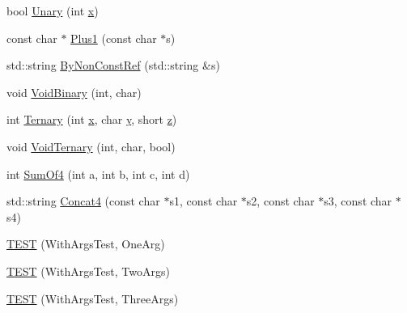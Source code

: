 \begin{DoxyCompactItemize}
\item 
bool \mbox{\hyperlink{namespacetesting_1_1gmock__generated__actions__test_a61f0e6c3f2c07079299f1d6e1667ab92}{Unary}} (int \mbox{\hyperlink{_obj__test_2lib_2googletest-master_2googlemock_2test_2gmock-matchers__test_8cc_a6150e0515f7202e2fb518f7206ed97dc}{x}})
\item 
const char $\ast$ \mbox{\hyperlink{namespacetesting_1_1gmock__generated__actions__test_a75e901c6d28c591c53a54320a294da55}{Plus1}} (const char $\ast$s)
\item 
std\+::string \mbox{\hyperlink{namespacetesting_1_1gmock__generated__actions__test_afe690aca473d063bec7f07e48e0e418c}{By\+Non\+Const\+Ref}} (std\+::string \&s)
\item 
void \mbox{\hyperlink{namespacetesting_1_1gmock__generated__actions__test_af957302d6c2b4dacd31385f2a34b529f}{Void\+Binary}} (int, char)
\item 
int \mbox{\hyperlink{namespacetesting_1_1gmock__generated__actions__test_a1b234626e33284c4159ea666d240d5ed}{Ternary}} (int \mbox{\hyperlink{_obj__test_2lib_2googletest-master_2googlemock_2test_2gmock-matchers__test_8cc_a6150e0515f7202e2fb518f7206ed97dc}{x}}, char \mbox{\hyperlink{_obj__test_2lib_2googletest-master_2googlemock_2test_2gmock-matchers__test_8cc_a39cb44155237f0205e0feb931d5acbed}{y}}, short \mbox{\hyperlink{_obj__test_2lib_2googletest-master_2googlemock_2test_2gmock-matchers__test_8cc_a196ff6a287f53f758b1506f21269fc77}{z}})
\item 
void \mbox{\hyperlink{namespacetesting_1_1gmock__generated__actions__test_a7b1b519421c70b90ea3c818d4cf565ac}{Void\+Ternary}} (int, char, bool)
\item 
int \mbox{\hyperlink{namespacetesting_1_1gmock__generated__actions__test_a2a5879c060adacf27c3528260172a7be}{Sum\+Of4}} (int a, int b, int c, int d)
\item 
std\+::string \mbox{\hyperlink{namespacetesting_1_1gmock__generated__actions__test_aab6acb97e71142752555bec85fa80d28}{Concat4}} (const char $\ast$s1, const char $\ast$s2, const char $\ast$s3, const char $\ast$s4)
\item 
\mbox{\hyperlink{namespacetesting_1_1gmock__generated__actions__test_ae6ef9e9d09c01cd0699a3044fd8c3f1f}{T\+E\+ST}} (With\+Args\+Test, One\+Arg)
\item 
\mbox{\hyperlink{namespacetesting_1_1gmock__generated__actions__test_afadf90d2d0acc55906bfd7f0f43f8a04}{T\+E\+ST}} (With\+Args\+Test, Two\+Args)
\item 
\mbox{\hyperlink{namespacetesting_1_1gmock__generated__actions__test_acae0920fc83b3990663b9d448b8bfd9a}{T\+E\+ST}} (With\+Args\+Test, Three\+Args)

\end{DoxyCompactItemize}
